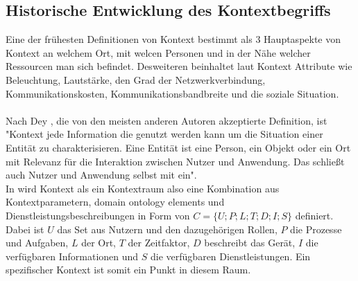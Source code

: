 \subsection{Historische Entwicklung des Kontextbegriffs}


Eine der frühesten Definitionen von Kontext \cite{schilit_context-aware_1994} bestimmt als 3 Hauptaspekte von Kontext an welchem Ort, mit welcen Personen und in der Nähe welcher Ressourcen man sich befindet.
Desweiteren beinhaltet laut \cite{schilit_context-aware_1994} Kontext Attribute wie Beleuchtung, Lautstärke, den Grad der Netzwerkverbindung, Kommunikationskosten, Kommunikationsbandbreite und die soziale Situation.\\\\
Nach Dey \cite{dey_understanding_2001}, die von den meisten anderen Autoren akzeptierte Definition\cite{kokinov_operational_2007,wei_liu_survey_2011}, ist "Kontext jede Information die genutzt werden kann um die Situation einer Entität zu charakterisieren. Eine Entität ist eine Person, ein Objekt oder ein Ort mit Relevanz für die Interaktion zwischen Nutzer und Anwendung. Das schließt auch Nutzer und Anwendung selbst mit ein".\\
In \cite{wolfgang_kaltz_context-aware_2005}  wird Kontext als ein Kontextraum also eine Kombination aus Kontextparametern, domain ontology elements und Dienstleistungsbeschreibungen in Form von $C = \{U;P;L;T;D;I;S\}$ definiert.\\ Dabei ist $U$ das Set aus Nutzern und den dazugehörigen Rollen, $P$ die Prozesse und Aufgaben, $L$ der Ort, $T$ der Zeitfaktor, $D$ beschreibt das Gerät, $I$ die verfügbaren Informationen und $S$ die verfügbaren Dienstleistungen. Ein spezifischer Kontext ist somit ein Punkt in diesem Raum. \\
